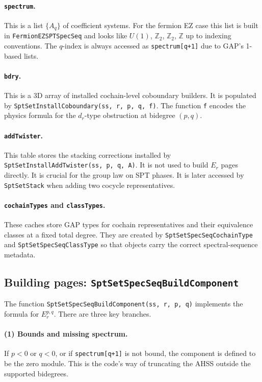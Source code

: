 \documentclass{SciPost}
\begin{document}
\paragraph{\texttt{spectrum}.}
This is a list $\{A_q\}$ of coefficient systems.
For the fermion EZ case this list is built in \texttt{FermionEZSPTSpecSeq} and looks like $U(1)$, $\mathbb{Z}_2$, $\mathbb{Z}_2$, $\mathbb{Z}$ up to indexing conventions.
The $q$-index is always accessed as \texttt{spectrum[q+1]} due to GAP's 1-based lists.

\paragraph{\texttt{bdry}.}
This is a 3D array of installed cochain-level coboundary builders.
It is populated by \texttt{SptSetInstallCoboundary(ss, r, p, q, f)}.
The function \texttt{f} encodes the physics formula for the $d_r$-type obstruction at bidegree $(p,q)$.

\paragraph{\texttt{addTwister}.}
This table stores the stacking corrections installed by \texttt{SptSetInstallAddTwister(ss, p, q, A)}.
It is not used to build $E_r$ pages directly.
It is crucial for the group law on SPT phases.
It is later accessed by \texttt{SptSetStack} when adding two cocycle representatives.

\paragraph{\texttt{cochainTypes} and \texttt{classTypes}.}
These caches store GAP types for cochain representatives and their equivalence classes at a fixed total degree.
They are created by \texttt{SptSetSpecSeqCochainType} and \texttt{SptSetSpecSeqClassType} so that objects carry the correct spectral-sequence metadata.

\subsection{Building pages: \texttt{SptSetSpecSeqBuildComponent}}

The function \texttt{SptSetSpecSeqBuildComponent(ss, r, p, q)} implements the formula for $E_r^{p,q}$.
There are three key branches.

\paragraph{(1) Bounds and missing spectrum.}
If $p<0$ or $q<0$, or if \texttt{spectrum[q+1]} is not bound, the component is defined to be the zero module.
This is the code's way of truncating the AHSS outside the supported bidegrees.
\end{document}
